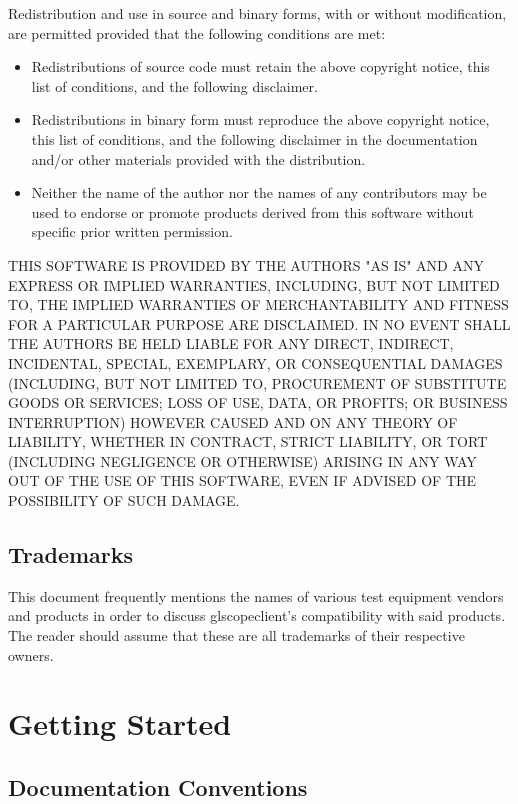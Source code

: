 \documentclass[11pt]{article}
\begin{document}
Redistribution and use in source and binary forms, with or without modification, are permitted provided that the
following conditions are met:
\begin{itemize}
\item Redistributions of source code must retain the above copyright notice, this list of conditions, and the
following disclaimer.
\item Redistributions in binary form must reproduce the above copyright notice, this list of conditions, and the
following disclaimer in the documentation and/or other materials provided with the distribution.
\item Neither the name of the author nor the names of any contributors may be used to endorse or promote products
derived from this software without specific prior written permission.
\end{itemize}

THIS SOFTWARE IS PROVIDED BY THE AUTHORS "AS IS" AND ANY EXPRESS OR IMPLIED WARRANTIES, INCLUDING, BUT NOT LIMITED
TO, THE IMPLIED WARRANTIES OF MERCHANTABILITY AND FITNESS FOR A PARTICULAR PURPOSE ARE DISCLAIMED. IN NO EVENT SHALL
THE AUTHORS BE HELD LIABLE FOR ANY DIRECT, INDIRECT, INCIDENTAL, SPECIAL, EXEMPLARY, OR CONSEQUENTIAL DAMAGES
(INCLUDING, BUT NOT LIMITED TO, PROCUREMENT OF SUBSTITUTE GOODS OR SERVICES; LOSS OF USE, DATA, OR PROFITS; OR
BUSINESS INTERRUPTION) HOWEVER CAUSED AND ON ANY THEORY OF LIABILITY, WHETHER IN CONTRACT, STRICT LIABILITY, OR TORT
(INCLUDING NEGLIGENCE OR OTHERWISE) ARISING IN ANY WAY OUT OF THE USE OF THIS SOFTWARE, EVEN IF ADVISED OF THE
POSSIBILITY OF SUCH DAMAGE.

\subsection{Trademarks}

This document frequently mentions the names of various test equipment vendors and products in order to discuss
glscopeclient's compatibility with said products. The reader should assume that these are all trademarks of their
respective owners.

\pagebreak
\section{Getting Started}

\subsection{Documentation Conventions}
\end{document}

